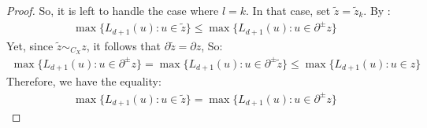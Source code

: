 \begin{proof}
So, it is left to handle the case where $l = k$. In that case, set $\tilde{z} = \tilde{z}_{k}$. By :
\begin{equation*}
  \begin{split}
    \max \big\{ L_{d+1}(u) :  u \in \tilde{z} \big\} \le  \max \big\{ L_{d+1}(u) : u \in \partial^{\pm} z \big\}
  \end{split}
\end{equation*}
Yet, since $\tilde{z} \sim_{C_{X}} z$, it follows that $\partial \tilde{z} = \partial z$, So: 
\begin{equation*}
  \begin{split}
     \max \big\{ L_{d+1}(u) :  u \in \partial^{\pm} z \big\} = \max \big\{ L_{d+1}(u) :  u \in  \partial^{\pm} \tilde{z} \big\} \le \max \big\{ L_{d+1}(u) : u \in z \big\} 
  \end{split}
\end{equation*}
Therefore, we have the equality:
\begin{equation*}
  \begin{split}
    \max \big\{ L_{d+1}(u) :  u \in \tilde{z} \big\} = \max \big\{ L_{d+1}(u) : u \in \partial^{\pm} z \big\}
  \end{split}
\end{equation*}
\end{proof}

